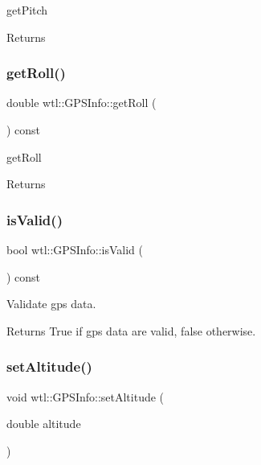 get\+Pitch 

\begin{DoxyReturn}{Returns}

\end{DoxyReturn}
\mbox{\label{classwtl_1_1_g_p_s_info_aa1080cd1d995f53311b974002bf72997}} 
\subsubsection{\texorpdfstring{get\+Roll()}{getRoll()}}
{\footnotesize\ttfamily double wtl\+::\+G\+P\+S\+Info\+::get\+Roll (\begin{DoxyParamCaption}{ }\end{DoxyParamCaption}) const}



get\+Roll 

\begin{DoxyReturn}{Returns}

\end{DoxyReturn}
\mbox{\label{classwtl_1_1_g_p_s_info_a4b05f34ce82445d516bf688ef817f04c}} 
\subsubsection{\texorpdfstring{is\+Valid()}{isValid()}}
{\footnotesize\ttfamily bool wtl\+::\+G\+P\+S\+Info\+::is\+Valid (\begin{DoxyParamCaption}{ }\end{DoxyParamCaption}) const}



Validate gps data. 

\begin{DoxyReturn}{Returns}
True if gps data are valid, false otherwise. 
\end{DoxyReturn}
\mbox{\label{classwtl_1_1_g_p_s_info_a560c21c3793312408ad85e40c16d9e4a}} 
\subsubsection{\texorpdfstring{set\+Altitude()}{setAltitude()}}
{\footnotesize\ttfamily void wtl\+::\+G\+P\+S\+Info\+::set\+Altitude (\begin{DoxyParamCaption}\item[{double}]{altitude }\end{DoxyParamCaption})}



